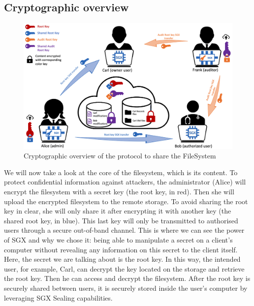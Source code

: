 \documentclass[../main.tex]{subfiles}
\begin{document}
\subsection{Cryptographic overview}
\label{section:lauxus:approach_crypto}
\begin{figure}[h]
    \centering
    \includegraphics[width=\textwidth]{images/lauxus/approach_crypto}
    
    \caption{Cryptographic overview of the protocol to share the FileSystem}
    \label{figure:lauxus:approach_crypto}
\end{figure}
\par We will now take a look at the core of the filesystem, which is its content. To protect confidential information against attackers, the administrator (Alice) will encrypt the filesystem with a secret key (the root key, in red). Then she will upload the encrypted filesystem to the remote storage. To avoid sharing the root key in clear, she will only share it after encrypting it with another key (the shared root key, in blue). This last key will only be transmitted to authorised users through a secure out-of-band channel. This is where we can see the power of SGX and why we chose it: being able to manipulate a secret on a client's computer without revealing any information on this secret to the client itself. Here, the secret we are talking about is the root key. In this way, the intended user, for example, Carl, can decrypt the key located on the storage and retrieve the root key. Then he can access and decrypt the filesystem. After the root key is securely shared between users, it is securely stored inside the user's computer by leveraging SGX Sealing capabilities.
\end{document}

